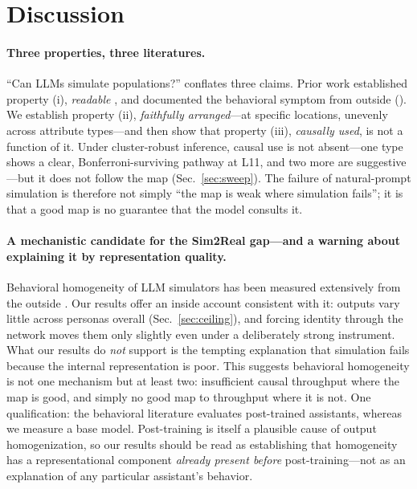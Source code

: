 \section{Discussion}
\label{sec:discussion}

\paragraph{Three properties, three literatures.}
``Can LLMs simulate populations?'' conflates three claims. Prior work
established property (i), \emph{readable} \citep{llmopinions2026}, and
documented the behavioral symptom from outside
(\citealp{sim2real2026,odyssim2026}). We establish property (ii),
\emph{faithfully arranged}---at specific locations, unevenly across
attribute types---and then show that property (iii), \emph{causally
used}, is not a function of it. Under cluster-robust inference, causal
use is not absent---one type shows a clear, Bonferroni-surviving pathway
at L11, and two more are suggestive---but it does not follow the map
(Sec.~\ref{sec:sweep}). The failure of natural-prompt
simulation is therefore not simply ``the map is weak where simulation
fails''; it is that a good map is no guarantee that the model consults
it.

\paragraph{A mechanistic candidate for the Sim2Real gap---and a warning
about explaining it by representation quality.}
Behavioral homogeneity of LLM simulators has been measured extensively
from the outside \citep{sim2real2026}. Our results offer an inside account
consistent with it: outputs vary little across personas overall
(Sec.~\ref{sec:ceiling}), and forcing identity through the network moves them only
slightly even under a deliberately strong instrument. What our results do
\emph{not} support is the tempting explanation that simulation fails
because the internal representation is poor. This suggests behavioral
homogeneity is not one mechanism but at least two: insufficient causal
throughput where the map is good, and simply no good map to throughput
where it is not. One qualification: the behavioral literature evaluates post-trained assistants, whereas we
measure a base model. Post-training is itself a plausible cause of
output homogenization, so our results should be read as establishing
that homogeneity has a representational component \emph{already present
before} post-training---not as an explanation of any particular
assistant's behavior.

